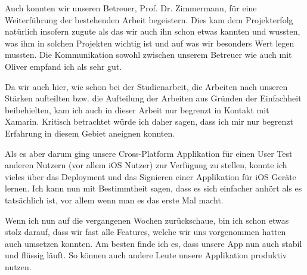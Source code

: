 Auch konnten wir unseren Betreuer, Prof. Dr. Zimmermann, für eine Weiterführung der bestehenden Arbeit begeistern. Dies kam dem Projekterfolg natürlich insofern zugute als das wir auch ihn schon etwas kannten und wussten, was ihm in solchen Projekten wichtig ist und auf was wir besonders Wert legen mussten. Die Kommunikation sowohl zwischen unserem Betreuer wie auch mit Oliver empfand ich als sehr gut.

Da wir auch hier, wie schon bei der Studienarbeit, die Arbeiten nach unseren Stärken aufteilten bzw. die Aufteilung der Arbeiten aus Gründen der Einfachheit beibehielten, kam ich auch in dieser Arbeit nur begrenzt in Kontakt mit Xamarin. Kritisch betrachtet würde ich daher sagen, dass ich mir nur begrenzt Erfahrung in diesem Gebiet aneignen konnten. 

Als es aber darum ging unsere Cross-Platform Applikation für einen User Test anderen Nutzern (vor allem iOS Nutzer) zur Verfügung zu stellen, konnte ich vieles über das Deployment und das Signieren einer Applikation für iOS Geräte lernen. Ich kann nun mit Bestimmtheit sagen, dass es sich einfacher anhört als es tatsächlich ist, vor allem wenn man es das erste Mal macht.

Wenn ich nun auf die vergangenen Wochen zurückschaue, bin ich schon etwas stolz darauf, dass wir fast alle Features, welche wir uns vorgenommen hatten auch umsetzen konnten. Am besten finde ich es, dass unsere App nun auch stabil und flüssig läuft. So können auch andere Leute unsere Applikation produktiv nutzen.
 